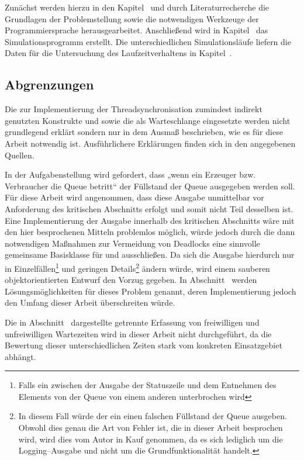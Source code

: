 Zunächst werden hierzu in den Kapitel~ und  durch Literaturrecherche die Grundlagen der Problemstellung sowie die notwendigen Werkzeuge der Programmiersprache herausgearbeitet. Anschließend wird in Kapitel~ das Simulationsprogramm erstellt. Die unterschiedlichen Simulationsläufe liefern die Daten für die Untersuchung des Laufzeitverhaltens in Kapitel~.


\subsection{Abgrenzungen} %
\label{sub:abgrenzungen}

Die zur Implementierung der Threadsynchronisation zumindest indirekt genutzten Konstrukte  und  sowie die als Warteschlange eingesetzte  werden nicht grundlegend erklärt sondern nur in dem Ausmaß beschrieben, wie es für diese Arbeit notwendig ist. Ausführlichere Erklärungen finden sich in den angegebenen Quellen.

In der Aufgabenstellung wird gefordert, dass „wenn ein Erzeuger bzw. Verbraucher die Queue betritt“ der Füllstand der Queue ausgegeben werden soll. Für diese Arbeit wird angenommen, dass diese Ausgabe unmittelbar vor Anforderung des kritischen Abschnitts erfolgt und somit nicht Teil desselben ist. Eine Implementierung der Ausgabe innerhalb des kritischen Abschnitts wäre mit den hier besprochenen Mitteln problemlos möglich, würde jedoch durch die dann notwendigen Maßnahmen zur Vermeidung von Deadlocks eine sinnvolle gemeinsame Basisklasse für  und  ausschließen. Da sich die Ausgabe hierdurch nur in Einzelfällen\footnote{Falls ein  zwischen der Ausgabe der Statuszeile und dem Entnehmen des Elements von der Queue von einem anderen  unterbrochen wird} und geringen Details\footnote{In diesem Fall würde der ein  einen falschen Füllstand der Queue ausgeben. Obwohl dies genau die Art von Fehler ist, die in dieser Arbeit besprochen wird, wird dies vom Autor in Kauf genommen, da es sich lediglich um die Logging–Ausgabe und nicht um die Grundfunktionalität handelt.} ändern würde, wird einem sauberen objektorientierten Entwurf den Vorzug gegeben. In Abschnitt~ werden Lösungsmöglichkeiten für dieses Problem genannt, deren Implementierung jedoch den Umfang dieser Arbeit überschreiten würde.

Die in Abschnitt~ dargestellte getrennte Erfassung von freiwilligen und unfreiwilligen Wartezeiten wird in dieser Arbeit nicht durchgeführt, da die Bewertung dieser unterschiedlichen Zeiten stark vom konkreten Einsatzgebiet abhängt.


